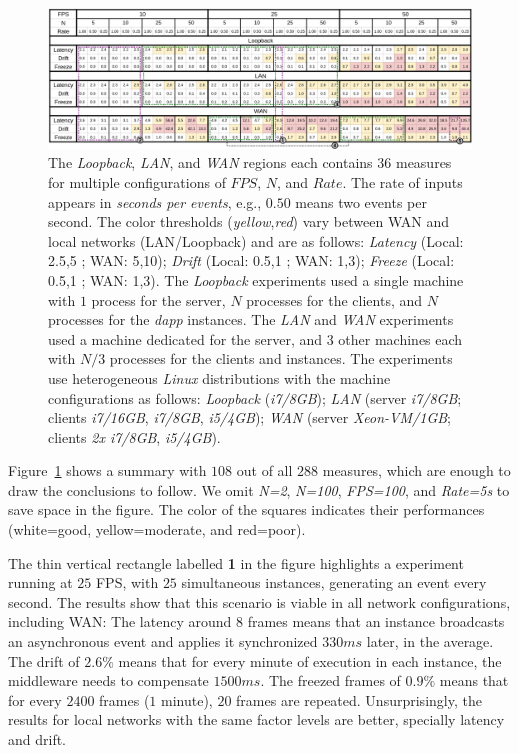 \documentclass[sigplan,screen]{acmart}
\newcommand{\dapp}{\emph{dapp}\xspace}
\begin{document}
\begin{figure}[t]
  \centering
  \includegraphics[width=\linewidth]{table2}
  \caption{
    \label{fig.table}
The \emph{Loopback}, \emph{LAN}, and \emph{WAN} regions each contains $36$
measures for multiple configurations of $FPS$, $N$, and $Rate$.
The rate of inputs appears in \emph{seconds per events}, e.g., $0.50$ means two
events per second.
%
The color thresholds (\emph{yellow},\emph{red}) vary between WAN and local
networks (LAN/Loopback) and are as follows:
    \emph{Latency} (Local: 2.5,5 ; WAN: 5,10);
    \emph{Drift}   (Local: 0.5,1 ; WAN: 1,3);
    \emph{Freeze}  (Local: 0.5,1 ; WAN: 1,3).
%
The \emph{Loopback} experiments used a single machine with $1$ process for the
server, $N$ processes for the clients, and $N$ processes for the \dapp
instances.
The \emph{LAN} and \emph{WAN} experiments used a machine dedicated for the
server, and $3$ other machines each with $N/3$ processes for the clients and
instances.
%
The experiments use heterogeneous \emph{Linux} distributions with the machine
configurations as follows:
    \emph{Loopback} (\emph{i7/8GB});
    \emph{LAN} (server \emph{i7/8GB}; clients \emph{i7/16GB}, \emph{i7/8GB}, \emph{i5/4GB});
    \emph{WAN} (server \emph{Xeon-VM/1GB}; clients \emph{2x i7/8GB}, \emph{i5/4GB}).
  }
\end{figure}

Figure~\ref{fig.table} shows a summary with $108$ out of all $288$ measures,
which are enough to draw the conclusions to follow.
We omit \emph{N=2}, \emph{N=100}, \emph{FPS=100}, and \emph{Rate=5s} to save
space in the figure.
The color of the squares indicates their performances
    (white=good, yellow=moderate, and red=poor).

The thin vertical rectangle labelled \textbf{1} in the figure highlights a
experiment running at $25$ FPS, with $25$ simultaneous instances, generating an
event every second.
%
The results show that this scenario is viable in all network configurations,
including WAN:
%
The latency around $8$ frames means that an instance broadcasts an asynchronous
event and applies it synchronized $330ms$ later, in the average.
The drift of $2.6\%$ means that for every minute of execution in each instance,
the middleware needs to compensate $1500ms$.
The freezed frames of $0.9\%$ means that for every $2400$ frames ($1$ minute),
$20$ frames are repeated.
%
Unsurprisingly, the results for local networks with the same factor levels are
better, specially latency and drift.
\end{document}
